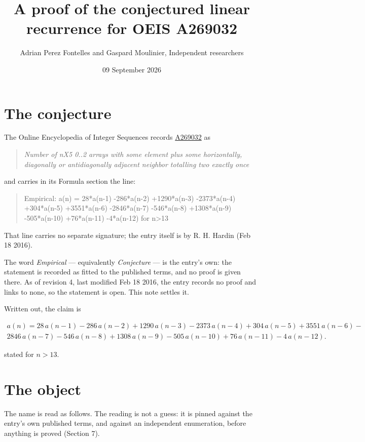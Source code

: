 \documentclass[11pt]{article}
\title{A proof of the conjectured linear recurrence for OEIS A269032}
\author{Adrian Perez Fontelles and Gaspard Moulinier, Independent researchers}
\date{09 September 2026}
\theoremstyle{definition}
\begin{document}
\maketitle
\section{The conjecture}

The Online Encyclopedia of Integer Sequences records \href{https://oeis.org/A269032}{A269032} as

\begin{quote}\itshape Number of nX5 0..2 arrays with some element plus some horizontally, diagonally or antidiagonally adjacent neighbor totalling two exactly once\end{quote}

and carries in its Formula section the line:

\begin{quote}\ttfamily Empirical: a(n) = 28*a(n-1) -286*a(n-2) +1290*a(n-3) -2373*a(n-4) +304*a(n-5) +3551*a(n-6) -2846*a(n-7) -546*a(n-8) +1308*a(n-9) -505*a(n-10) +76*a(n-11) -4*a(n-12) for n>13\end{quote}

That line carries no separate signature; the entry itself is by R. H. Hardin (Feb 18 2016).

The word {\itshape Empirical} --- equivalently {\itshape Conjecture} --- is the entry's own: the statement is recorded as fitted to the published terms, and no proof is given there. As of revision 4, last modified Feb 18 2016, the entry records no proof and links to none, so the statement is open. This note settles it.

Written out, the claim is

\begin{multline*} a(n) = 28\,a(n-1) - 286\,a(n-2) + 1290\,a(n-3) - 2373\,a(n-4) + 304\,a(n-5) + 3551\,a(n-6) - \\ 2846\,a(n-7) - 546\,a(n-8) + 1308\,a(n-9) - 505\,a(n-10) + 76\,a(n-11) - 4\,a(n-12). \end{multline*}

stated for $n > 13$.

\section{The object}

The name is read as follows. The reading is not a guess: it is pinned against the entry's own published terms, and against an independent enumeration, before anything is proved (Section 7).
\end{document}
